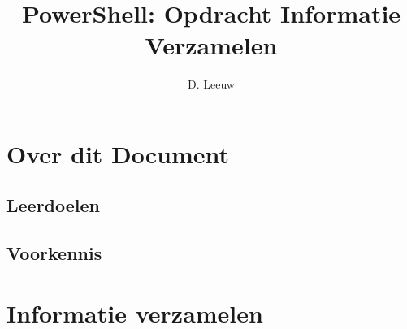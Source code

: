 \documentclass[a4paper,12pt,twoside,openright,titlepage]{article}
\author{D. Leeuw}
\title{PowerShell: Opdracht Informatie Verzamelen}
\date{\today\\
0.5.0 \\
\vfill
\raggedright
\copyright\ 2026 Dennis Leeuw\\
}
\begin{document}

\maketitle


\section{Over dit Document}
\subsection{Leerdoelen}
\subsection{Voorkennis}



\section{Informatie verzamelen}


\printindex
\end{document}
